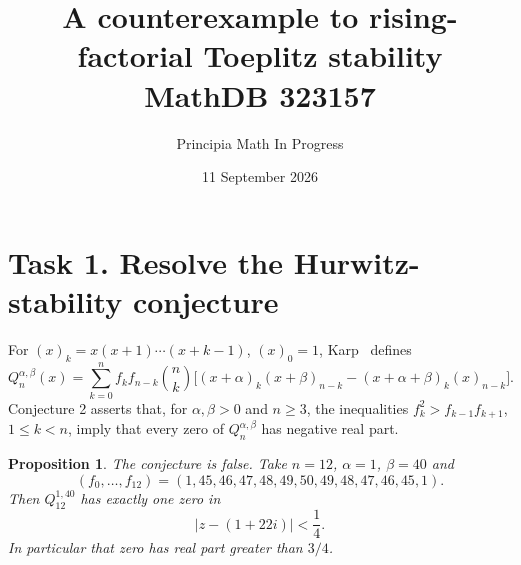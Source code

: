\documentclass[11pt]{article}
\title{A counterexample to rising-factorial Toeplitz stability\\
\large MathDB 323157}
\author{Principia Math In Progress}
\date{11 September 2026}
\newtheorem{proposition}{Proposition}
\begin{document}
\maketitle

\section*{Task 1. Resolve the Hurwitz-stability conjecture}

For $(x)_k=x(x+1)\cdots(x+k-1)$, $(x)_0=1$, Karp~\cite{K}
defines
\[
 Q_n^{\alpha,\beta}(x)=
 \sum_{k=0}^n f_kf_{n-k}\binom nk
 \bigl[(x+\alpha)_k(x+\beta)_{n-k}
       -(x+\alpha+\beta)_k(x)_{n-k}\bigr].
\]
Conjecture 2 asserts that, for $\alpha,\beta>0$ and $n\geq3$,
the inequalities $f_k^2>f_{k-1}f_{k+1}$, $1\leq k<n$, imply
that every zero of $Q_n^{\alpha,\beta}$ has negative real part.

\begin{proposition}
The conjecture is false. Take $n=12$, $\alpha=1$, $\beta=40$ and
\[
 (f_0,\ldots,f_{12})
 =(1,45,46,47,48,49,50,49,48,47,46,45,1).
\]
Then $Q_{12}^{1,40}$ has exactly one zero in
\[
       |z-(1+22i)|<\frac14.
\]
In particular that zero has real part greater than $3/4$.
\end{proposition}
\end{document}
